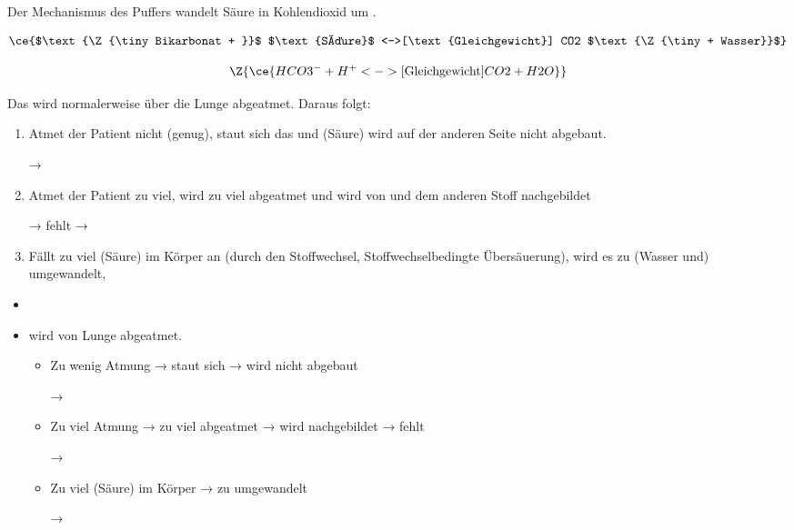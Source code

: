 {
Der Mechanismus des Puffers wandelt Säure  in Kohlendioxid  um .

\begin{equation}
\ce{$\text{\Z{\tiny Bikarbonat + }}$ $\text{Säure}$
        <->[\text{Gleichgewicht}] CO2 $\text{\Z{\tiny + Wasser}}$}
\end{equation}

\begin{equation}
\Z{\ce{HCO3^- + H^+ <->[\text{Gleichgewicht}] CO2 +
        H2O}}
\end{equation}        
        
Das  wird normalerweise über die Lunge abgeatmet. Daraus folgt: 

\begin{enumerate}
  \item Atmet der Patient nicht (genug), staut
  sich das  und  (Säure) wird auf der anderen Seite nicht
  abgebaut.
  
  → 
  \item Atmet der Patient zu viel, wird zu viel
   abgeatmet und wird von  und dem
  anderen Stoff nachgebildet 
  
  → 
  fehlt → 
  \item Fällt zu viel  (Säure) im
  Körper an (durch den Stoffwechsel, Stoffwechselbedingte Übersäuerung), wird
  es zu (Wasser und)  umgewandelt, 
\end{enumerate}
}{
\begin{itemize}
  \item {}
  \item {} wird von Lunge abgeatmet.
  \begin{itemize}
    \item Zu wenig Atmung →  staut
    sich →  wird nicht abgebaut
    
    → 
    \item Zu viel Atmung → zu viel  abgeatmet →  wird
    nachgebildet → 
    fehlt 
    
    → 
    \item Zu viel  (Säure) im
    Körper → zu  umgewandelt 
    
    → 
  \end{itemize}
\end{itemize}
}{}{}{}











